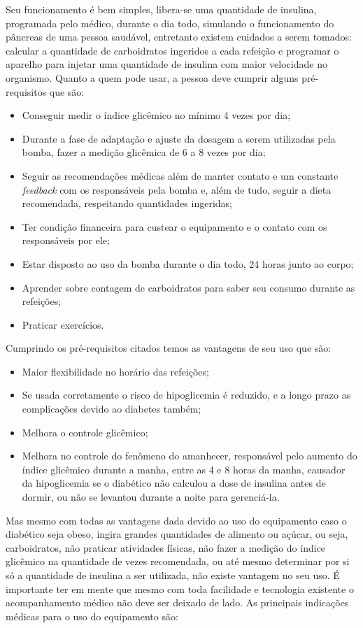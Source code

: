 Seu funcionamento é bem simples, libera-se uma quantidade de insulina, programada pelo médico, durante o dia todo, simulando o funcionamento do pâncreas de uma pessoa saudável, entretanto existem cuidados a serem tomados: calcular a quantidade de carboidratos ingeridos a cada refeição e programar o aparelho para injetar uma quantidade de insulina com maior velocidade no organismo.
Quanto a quem pode usar, a pessoa deve cumprir alguns pré-requisitos que são:
\begin{itemize}
\item Conseguir medir o índice glicêmico no mínimo 4 vezes por dia;
\item Durante a fase de adaptação e ajuste da dosagem a serem utilizadas pela bomba, fazer a medição glicêmica de 6 a 8 vezes por dia;
\item Seguir as recomendações médicas além de manter contato e um constante \emph{feedback} com os responsáveis pela bomba e, além de tudo, seguir a dieta recomendada, respeitando quantidades ingeridas;
\item Ter condição financeira para custear o equipamento e o contato com os responsáveis por ele;
\item Estar disposto ao uso da bomba durante o dia todo, 24 horas junto ao corpo;
\item Aprender sobre contagem de carboidratos para saber seu consumo durante as refeições;
\item Praticar exercícios.
\end{itemize}

Cumprindo os pré-requisitos citados temos as vantagens de seu uso que são:

\begin{itemize}
\item Maior flexibilidade no horário das refeições;
\item Se usada corretamente o risco de hipoglicemia é reduzido, e a longo prazo as complicações devido ao diabetes também;
\item Melhora o controle glicêmico;
\item Melhora no controle do fenômeno do amanhecer, responsável pelo aumento do índice glicêmico durante a manha, entre as 4 e 8 horas da manha, causador da hipoglicemia se o diabético não calculou a dose de insulina antes de dormir, ou não se levantou durante a noite para gerenciá-la.
\end{itemize}

Mas mesmo com todas as vantagens dada devido ao uso do equipamento caso o diabético seja obeso, ingira grandes quantidades de alimento ou açúcar, ou seja, carboidratos, não praticar atividades físicas, não fazer a medição do índice glicêmico na quantidade de vezes recomendada, ou até mesmo determinar por si só a quantidade de insulina a ser utilizada, não existe vantagem no seu uso.
É importante ter em mente que mesmo com toda facilidade e tecnologia existente o acompanhamento médico não deve ser deixado de lado. As principais indicações médicas para o uso do equipamento são:

